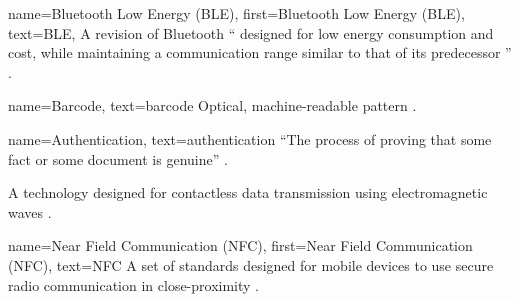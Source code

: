 {
  name={Bluetooth Low Energy (BLE)},
  first={Bluetooth Low Energy (BLE)},
  text={BLE},
}
{
  A revision of Bluetooth \textemdash \enquote{
    designed for low energy consumption and cost, while
    maintaining a communication range similar to that of
    its predecessor
  } \parencite{usingBluetoothBeacons}.
}

{
  name={Barcode},
  text={barcode}
}
{
  Optical, machine-readable pattern
  \parencite{whatIsABarcode}.
}

{
  name={Authentication},
  text=authentication
}
{
  \enquote{The process of proving that some fact or some
    document is genuine} \parencite{whatIsAuth}.
}

{
  A technology designed for contactless data transmission
  using electromagnetic waves \parencite{whatIsRfid}.
}

{
  name={Near Field Communication (NFC)},
  first={Near Field Communication (NFC)},
  text={NFC}
}
{
  A set of standards designed for mobile devices to use
  secure radio communication in close-proximity \cite{nfc}.
}
